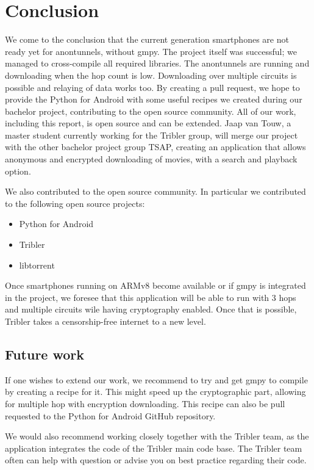 \chapter{Conclusion}
\label{cpt:conclusion}
	We come to the conclusion that the current generation smartphones are not ready yet for anontunnels, without gmpy. The project itself was successful; we managed to cross-compile all required libraries. The anontunnels are running and downloading when the hop count is low. Downloading over multiple circuits is possible and relaying of data works too. By creating a pull request, we hope to provide the Python for Android with some useful recipes we created during our bachelor project, contributing to the open source community. 
	All of our work, including this report, is open source and can be extended. Jaap van Touw, a master student currently working for the Tribler group, will merge our project with the other bachelor project group TSAP, creating an application that allows anonymous and encrypted downloading of movies, with a search and playback option.
	
	We also contributed to the open source community. In particular we contributed to the following open source projects:
	\begin{itemize}
		\item Python for Android
		\item Tribler
		\item libtorrent
	\end{itemize}
	
	
	Once smartphones running on ARMv8 become available or if gmpy is integrated in the project, we foresee that this application will be able to run with 3 hops and multiple circuits wile having cryptography enabled. Once that is possible, Tribler takes a censorship-free internet to a new level.
	
	\section{Future work}
		If one wishes to extend our work, we recommend to try and get gmpy to compile by creating a recipe for it. This might speed up the cryptographic part, allowing for multiple hop with encryption downloading. This recipe can also be pull requested to the Python for Android GitHub repository.
		
		We would also recommend working closely together with the Tribler team, as the application integrates the code of the Tribler main code base. The Tribler team often can help with question or advise you on best practice regarding their code.
		
